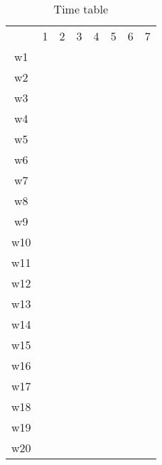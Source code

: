 \renewcommand{\arraystretch}{1.2}
\begin{table}[h]
    \begin{center}
        \begin{tabular}{ c c c c c c c c }
        & 1 & 2 & 3 & 4 & 5 & 6 & 7 \\ 
        w1  & \cellcolor{green!10!orange} \\  
        w2  & \cellcolor{green!10!orange} \\ 
        w3  &   & \cellcolor{green!20!orange} \\ 
        w4  &   & \cellcolor{green!20!orange} \\
        w5  &   & \cellcolor{green!20!orange} \\  
        w6  &   &   & \cellcolor{green!30!orange} \\ 
        w7  &   &   & \cellcolor{green!30!orange} \\ 
        w8  &   &   & \cellcolor{green!30!orange} \\
        w9  &   &   & \cellcolor{green!30!orange} \\  
        w10 &   &   &   & \cellcolor{green!40!orange} \\ 
        w11 &   &   &   & \cellcolor{green!40!orange} \\ 
        w12 &   &   &   &   & \cellcolor{green!50!orange} \\
        w13 &   &   &   &   & \cellcolor{green!50!orange} \\  
        w14 &   &   &   &   & \cellcolor{green!50!orange} \\ 
        w15 &   &   &   &   & \cellcolor{green!50!orange} \\ 
        w16 &   &   &   &   & \cellcolor{green!50!orange} \\ 
        w17 &   &   &   &   & \cellcolor{green!50!orange} \\  
        w18 &   &   &   &   &   & \cellcolor{green!60!orange} \\ 
        w19 &   &   &   &   &   & \cellcolor{green!60!orange} \\ 
        w20 &   &   &   &   &   &   & \cellcolor{green!70!orange} \\   
        \end{tabular}
    \end{center}
    \caption{Time table}
    \label{tab:timetable}
\end{table}